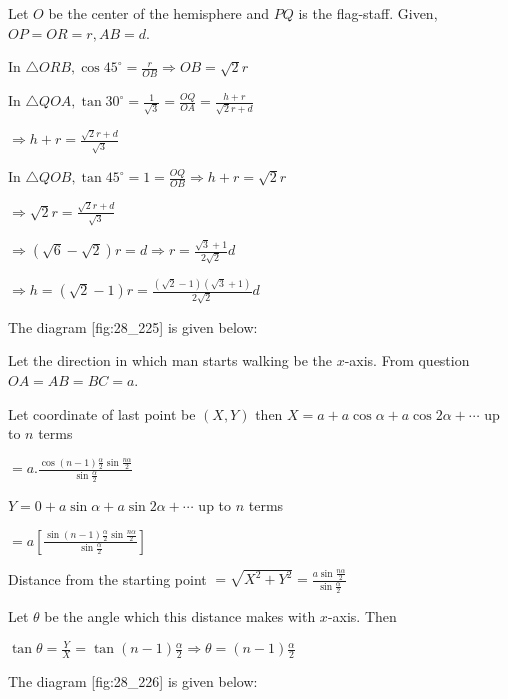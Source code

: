   Let $O$ be the center of the hemisphere and $PQ$ is the flag-staff. Given, $OP = OR =
  r, AB = d$.

  In $\triangle ORB, \cos45^\circ = \frac{r}{OB} \Rightarrow OB = \sqrt{2}r$

  In $\triangle QOA, \tan30^\circ = \frac{1}{\sqrt{3}} = \frac{OQ}{OA} = \frac{h + r}{\sqrt{2}r + d}$

  $\Rightarrow h + r = \frac{\sqrt{2}r + d}{\sqrt{3}}$

  In $\triangle QOB, \tan45^\circ = 1 = \frac{OQ}{OB} \Rightarrow h + r = \sqrt{2}r$

  $\Rightarrow \sqrt{2}r = \frac{\sqrt{2}r + d}{\sqrt{3}}$

  $\Rightarrow (\sqrt{6} - \sqrt{2})r = d \Rightarrow r = \frac{\sqrt{3} + 1}{2\sqrt{2}}d$

  $\Rightarrow h = (\sqrt{2} - 1)r = \frac{(\sqrt{2} - 1)(\sqrt{3} + 1)}{2\sqrt{2}}d$

\item The diagram [fig:28_225] is given below:

  \startplacefigure[reference=fig:28_225]
    \externalfigure[28_225.pdf]
  \stopplacefigure

  Let the direction in which man starts walking be the $x$-axis. From question $OA = AB = BC
  = a$.

  Let coordinate of last point be $(X, Y)$ then $X = a + a\cos\alpha + a\cos2\alpha + \cdots$
  up to $n$ terms

  $= a.\frac{\cos(n - 1)\frac{\alpha}{2}\sin\frac{n\alpha}{2}}{\sin\frac{\alpha}{2}}$

  $Y = 0 + a\sin\alpha + a\sin2\alpha + \cdots$ up to $n$ terms

  $= a\left[\frac{\sin(n - 1)\frac{\alpha}{2}\sin\frac{n\alpha}{2}}{\sin\frac{\alpha}{2}}\right]$

  Distance from the starting point $= \sqrt{X^2 + Y^2} =
  \frac{a\sin\frac{n\alpha}{2}}{\sin\frac{\alpha}{2}}$

  Let $\theta$ be the angle which this distance makes with $x$-axis. Then

  $\tan\theta = \frac{Y}{X} = \tan(n - 1)\frac{\alpha}{2} \Rightarrow \theta = (n -
  1)\frac{\alpha}{2}$

\item The diagram [fig:28_226] is given below:

  \startplacefigure[reference=fig:28_226]
    \externalfigure[28_226.pdf]
  \stopplacefigure

